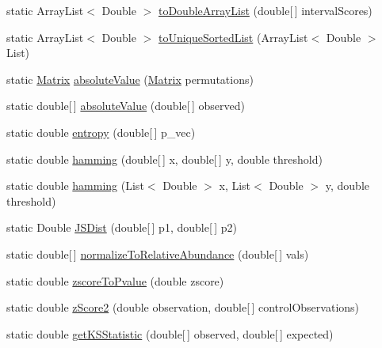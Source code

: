 \begin{DoxyCompactItemize}
static Array\+List$<$ Double $>$ \hyperlink{classbroad_1_1core_1_1math_1_1_statistics_a4b27fc3feabc6bc032696cbd1f9b9c62}{to\+Double\+Array\+List} (double\mbox{[}$\,$\mbox{]} interval\+Scores)
\item 
static Array\+List$<$ Double $>$ \hyperlink{classbroad_1_1core_1_1math_1_1_statistics_a48edc37f8eca795ff5d81ab7096fb07e}{to\+Unique\+Sorted\+List} (Array\+List$<$ Double $>$ List)
\item 
static \hyperlink{class_jama_1_1_matrix}{Matrix} \hyperlink{classbroad_1_1core_1_1math_1_1_statistics_af710b1832e0899bb46a1ecf3283dc9a4}{absolute\+Value} (\hyperlink{class_jama_1_1_matrix}{Matrix} permutations)
\item 
static double\mbox{[}$\,$\mbox{]} \hyperlink{classbroad_1_1core_1_1math_1_1_statistics_a2d94e63983b9c44468df205a69ac4347}{absolute\+Value} (double\mbox{[}$\,$\mbox{]} observed)
\item 
static double \hyperlink{classbroad_1_1core_1_1math_1_1_statistics_a685757c7e3806194e06007b465a5f8cf}{entropy} (double\mbox{[}$\,$\mbox{]} p\+\_\+vec)
\item 
static double \hyperlink{classbroad_1_1core_1_1math_1_1_statistics_a8ca022c12d406c171f5d66a339f69db2}{hamming} (double\mbox{[}$\,$\mbox{]} x, double\mbox{[}$\,$\mbox{]} y, double threshold)
\item 
static double \hyperlink{classbroad_1_1core_1_1math_1_1_statistics_a557f1f47870a53fdf0f8a4d509a38c17}{hamming} (List$<$ Double $>$ x, List$<$ Double $>$ y, double threshold)
\item 
static Double \hyperlink{classbroad_1_1core_1_1math_1_1_statistics_a3b2374c6c72c021169306c8538f806f2}{J\+S\+Dist} (double\mbox{[}$\,$\mbox{]} p1, double\mbox{[}$\,$\mbox{]} p2)
\item 
static double\mbox{[}$\,$\mbox{]} \hyperlink{classbroad_1_1core_1_1math_1_1_statistics_a2777bb2a762d7130fe136d8951ad4d4e}{normalize\+To\+Relative\+Abundance} (double\mbox{[}$\,$\mbox{]} vals)
\item 
static double \hyperlink{classbroad_1_1core_1_1math_1_1_statistics_ab69119ba13fd45347c5ccd1beac4889e}{zscore\+To\+Pvalue} (double zscore)
\item 
static double \hyperlink{classbroad_1_1core_1_1math_1_1_statistics_ab0107da12d9333bdfe6d2b5db504d534}{z\+Score2} (double observation, double\mbox{[}$\,$\mbox{]} control\+Observations)
\item 
static double \hyperlink{classbroad_1_1core_1_1math_1_1_statistics_a4ec55597e8c774dba8de302ae6fc00ea}{get\+K\+S\+Statistic} (double\mbox{[}$\,$\mbox{]} observed, double\mbox{[}$\,$\mbox{]} expected)
\end{DoxyCompactItemize}
